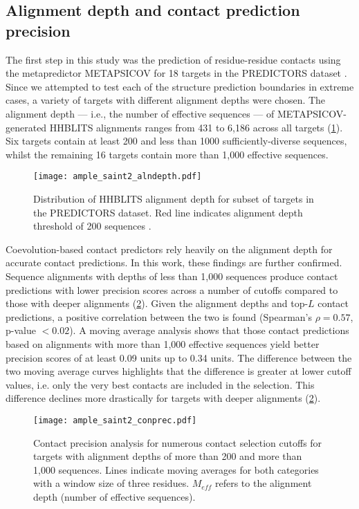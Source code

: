 \subsection{Alignment depth and contact prediction precision}
The first step in this study was the prediction of residue-residue contacts using the metapredictor METAPSICOV for 18 targets in the PREDICTORS dataset \cite{Jones2015-vq}. Since we attempted to test each of the structure prediction boundaries in extreme cases, a variety of targets with different alignment depths were chosen. The alignment depth --- i.e., the number of effective sequences --- of METAPSICOV-generated HHBLITS alignments ranges from 431 to 6,186 across all targets (\cref{fig:ample_saint2_alndepth}). Six targets contain at least 200 and less than 1000 sufficiently-diverse sequences, whilst the remaining 16 targets contain more than 1,000 effective sequences.

\begin{figure}[H]
    \centering
    \texttt{[image: ample\_saint2\_alndepth.pdf]}
    \caption[Alignment depth for subsets of targets in the PREDICTORS dataset]{Distribution of HHBLITS alignment depth for subset of targets in the PREDICTORS dataset. Red line indicates alignment depth threshold of 200 sequences \cite{Simkovic2017-xs}.}
    \label{fig:ample_saint2_alndepth}
\end{figure}

Coevolution-based contact predictors rely heavily on the alignment depth for accurate contact predictions. In this work, these findings are further confirmed. Sequence alignments with depths of less than 1,000 sequences produce contact predictions with lower precision scores across a number of cutoffs compared to those with deeper alignments (\cref{fig:ample_saint2_conprec}). Given the alignment depths and top-$L$ contact predictions, a positive correlation between the two is found (Spearman's $\rho=0.57$, p-value $<0.02$). A moving average analysis shows that those contact predictions based on alignments with more than 1,000 effective sequences yield better precision scores of at least 0.09 units up to 0.34 units. The difference between the two moving average curves highlights that the difference is greater at lower cutoff values, i.e. only the very best contacts are included in the selection. This difference declines more drastically for targets with deeper alignments (\cref{fig:ample_saint2_conprec}).

\begin{figure}[H]
    \centering
    \texttt{[image: ample\_saint2\_conprec.pdf]}
    \caption[Contact predicion analysis for numerous contact selection cutoffs]{Contact precision analysis for numerous contact selection cutoffs for targets with alignment depths of more than 200 and more than 1,000 sequences. Lines indicate moving averages for both categories with a window size of three residues. $M_{eff}$ refers to the alignment depth (number of effective sequences).}
    \label{fig:ample_saint2_conprec}
\end{figure}

